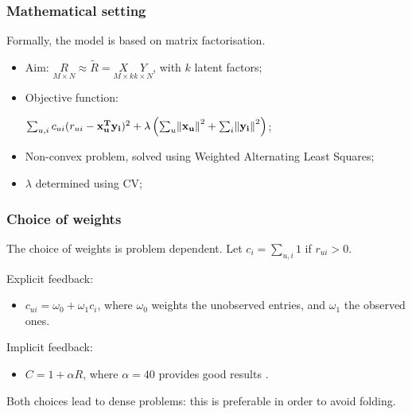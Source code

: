 \documentclass[xcolor = {table}]{beamer}
\begin{document}
  \begin{frame}
    \frametitle{Mathematical setting}
    Formally, the model is based on matrix factorisation.
    \vspace{1em}
    \begin{itemize}
      \setlength\itemsep{1em}
    \item Aim: $ \underset{\scriptscriptstyle{M \times N}}{R} \approx \widetilde{R} = \underset{\scriptscriptstyle{M\times k}}{X}\underset{\scriptscriptstyle{k\times N}}{Y}$, with $k$ latent factors;
      \item Objective function:
        \begin{center}
          $\sum_{u, i} c_{ui} (r_{ui} - \mathbf{x_u^T y_i})^2 + \lambda \left( \sum_u \norm{\mathbf{x_u}}^2 + \sum_i \norm{\mathbf{y_i}}^2 \right)$;
        \end{center}
      \item Non-convex problem, solved using Weighted Alternating Least Squares;
      \item $\lambda$ determined using CV;
    \end{itemize}
  \end{frame}



  \begin{frame}
    \frametitle{Choice of weights}

    The choice of weights is problem dependent. Let $c_i = \sum_{u, i} 1$ if $r_{ui} > 0$.\\

    \vspace{1em}

    Explicit feedback:

    \begin{itemize}
      \setlength\itemsep{1em}
      \item $c_{ui} = \omega_0 + \omega_1 c_i$, where $\omega_0$ weights the unobserved entries, and $\omega_1$ the observed ones.
    \end{itemize}
    \vspace{1em}
    Implicit feedback:\\
    \begin{itemize}
      \setlength\itemsep{1em}
      \item $C = 1 + \alpha R$, where $\alpha =  40$ provides good results \cite{collaborative}.
    \end{itemize}

    \vspace{1em}

    Both choices lead to dense problems: this is preferable in order to avoid folding.

  \end{frame}
\end{document}

